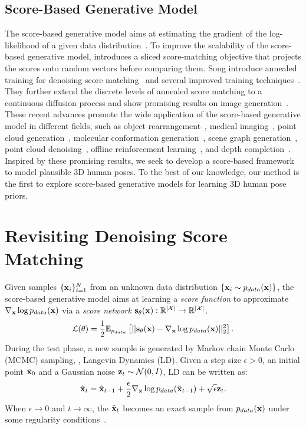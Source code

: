 \documentclass[10pt,twocolumn,letterpaper]{article}
\begin{document}
\subsection{Score-Based Generative Model}
The score-based generative model aims at estimating the gradient of the log-likelihood of a given data distribution~\cite{denosingScoreMatching, hyvarinen2005estimation, song2020sliced, song2019generative, song2020improved, song2020score, song2021maximum}. 
To improve the scalability of the score-based generative model, \cite{song2020sliced} introduces a sliced score-matching objective that projects the scores onto random vectors before comparing them.
Song \etal introduce annealed training for denoising score matching~\cite{song2019generative} and several improved training techniques~\cite{song2020improved}. They further extend the discrete levels of annealed score matching to a continuous diffusion process and show promising results on image generation~\cite{song2020score}.
These recent advances promote the wide application of the score-based generative model in different fields, such as object rearrangement~\cite{wu2022targf}, medical imaging~\cite{song2021solving}, point cloud generation~\cite{cai2020learning}, molecular conformation generation~\cite{shi2021learning}, scene graph generation~\cite{suhail2021energy}, point cloud denoising~\cite{luo2021score}, offline reinforcement learning~\cite{janner2022planning}, and depth completion~\cite{shao2022diffustereo}.
Inspired by these promising results, we seek to develop a score-based framework to model plausible 3D human poses.
To the best of our knowledge, our method is the first to explore score-based generative models for learning 3D human pose priors.
 
\section{Revisiting Denoising Score Matching}\label{sec:preliminary}
Given samples $\{ \mathbf{x}_i \}_{i=1}^N$ from an unknown data distribution $\{ \mathbf{x}_i \sim p_{data}(\mathbf{x}) \}$, 
the score-based generative model aims at learning a \textit{score function} to approximate $\nabla_{\mathbf{x}} \log p_{data}(\mathbf{x})$ via a \textit{score network} $\mathbf{s}_{\theta}(\mathbf{x}): \mathbb{R}^{|\mathcal{X}|} \rightarrow \mathbb{R}^{|\mathcal{X}|}$.
\begin{equation}
    \mathcal{L}(\theta) = \frac{1}{2}\mathbb{E}_{p_{data}}\left[||\mathbf{s}_{\theta}(\mathbf{x}) - \nabla_{\mathbf{x}} \log p_{data}(\mathbf{x})||^2_2\right].
\label{eq: Vanilla Score-matching}
\end{equation}
During the test phase, a new sample is generated by Markov chain Monte Carlo (MCMC) sampling, \eg, Langevin Dynamics (LD). Given a step size $\epsilon > 0$, an initial point $\tilde{\mathbf{x}}_0$ and a Gaussian noise $\mathbf{z}_t \sim \mathcal{N}(0, I)$, LD can be written as:
\begin{equation}
    \tilde{\mathbf{x}}_t = \tilde{\mathbf{x}}_{t-1} + \frac{\epsilon}{2}\nabla_{\mathbf{x}}\log p_{data}(\tilde{\mathbf{x}}_{t-1}) + \sqrt{\epsilon} \mathbf{z}_t.
\label{eq: Langevin Dynamics}
\end{equation}
When $\epsilon \rightarrow 0$ and $t \rightarrow \infty$, the $\tilde{\mathbf{x}}_t$ becomes an exact sample from $p_{data}(\mathbf{x})$ under some regularity conditions~\cite{welling2011bayesian}.
\end{document}
